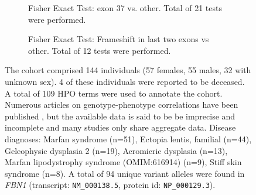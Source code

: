 \begin{figure}[htbp]
\begin{subfigure}[b]{0.95\textwidth}
\centering
{}
\captionsetup{justification=raggedright,singlelinecheck=false}
\caption{Fisher Exact Test:  exon 37 vs. other. Total of 21 tests were performed. }
\end{subfigure}
\begin{subfigure}[b]{0.95\textwidth}
\centering
{}
\captionsetup{justification=raggedright,singlelinecheck=false}
\caption{Fisher Exact Test: Frameshift in last two exons vs other. Total of  12 tests were performed. }
\end{subfigure}
\caption{The cohort comprised 144 individuals (57 females, 55 males, 32 with unknown sex). 
4 of these individuals were reported to be deceased. A total of 109 HPO terms were used to annotate the cohort. 
Numerous articles on genotype-phenotype correlations have been published \cite{PMID_29357934,PMID_33731877,PMID_33174221}, 
but the available data is said to be be imprecise and incomplete \cite{PMID_27906200} and many studies only share aggregate data.
Disease diagnoses: Marfan syndrome (n=51), Ectopia lentis, familial (n=44), Geleophysic dysplasia 2 (n=19), 
Acromicric dysplasia  (n=13), Marfan lipodystrophy syndrome (OMIM:616914) (n=9), Stiff skin syndrome  (n=8).  
A total of 94 unique variant alleles were found in \textit{FBN1} (transcript: \texttt{NM\_000138.5}, protein id: \texttt{NP\_000129.3}).}
\end{figure}
